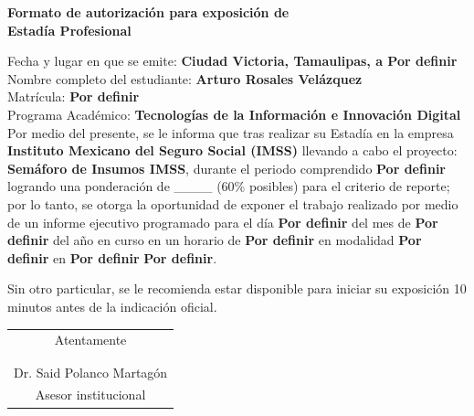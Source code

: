 \documentclass[12pt]{article}
\newcommand{\NombreAlumno}{Arturo Rosales Velázquez}
\newcommand{\NombreProyecto}{Semáforo de Insumos IMSS}
\newcommand{\UnidadEconomica}{Instituto Mexicano del Seguro Social (IMSS)}
\newcommand{\nasesorinstitucional}{Dr. Said Polanco Martagón}
\newcommand{\Matricula}           {Por definir}  %
\newcommand{\ncuatrimestre}{Por definir}
\newcommand{\fechaAutorizacionInforme}               {Por definir}
\newcommand{\DiaEvaluacionPesentacion}{Por definir}
\newcommand{\MesEvaluacionPesentacion}{Por definir}
\newcommand{\HoraEvaluacionPesentacion}{Por definir}
\newcommand{\modalidadEvaluacionPesentacion}{Por definir} %
\newcommand{\tipoAulaOficinaEnlacePesentacion}{Por definir} %
\newcommand{\AulaEvaluacionOEnlaceMeetPesentacion}{Por definir} %
\newcommand{\ncarrera}            {Tecnologías de la Información e Innovación Digital}
\begin{document}
\begin{center}
{\Large \textbf{Formato de autorización para exposición de}}\\[0.125cm]
{\Large \textbf{Estadía Profesional}}\\[0.25cm]
\end{center}

\noindent
Fecha y lugar en que se emite: \textbf{Ciudad Victoria, Tamaulipas, a \fechaAutorizacionInforme } \\[0.125cm]
Nombre completo del estudiante: \textbf{\NombreAlumno} \\[0.125cm]
Matrícula: \textbf{\Matricula}  \\[0.125cm]
Programa Académico: \textbf{\ncarrera}  \\[0.25cm]

\noindent
Por medio del presente, se le informa que tras realizar su Estadía en la empresa \textbf{\UnidadEconomica} llevando a cabo el proyecto: \textbf{\NombreProyecto}, durante el periodo comprendido \textbf{\ncuatrimestre} logrando una ponderación de \_\_\_\_  (60\% posibles) para el criterio de reporte; por lo tanto, se otorga la oportunidad de exponer el trabajo realizado por medio de un informe ejecutivo programado para el día \textbf{\DiaEvaluacionPesentacion} del mes de \textbf{\MesEvaluacionPesentacion} del año en curso en un horario de \textbf{\HoraEvaluacionPesentacion} en modalidad \textbf{\modalidadEvaluacionPesentacion} en \textbf{\tipoAulaOficinaEnlacePesentacion} \textbf{\AulaEvaluacionOEnlaceMeetPesentacion}.

\vspace{0.25cm}

\noindent
Sin otro particular, se le recomienda estar disponible para iniciar su exposición 10 minutos antes de la indicación oficial.

\vspace{0.5cm}

\begin{center}
\begin{tabular}{p{10cm}}
\multicolumn{1}{c}{Atentamente}   \\
 \\
 \\ \hline
\multicolumn{1}{c}{\nasesorinstitucional}   \\
\multicolumn{1}{c}{Asesor institucional}   \\
\end{tabular}
\end{center}

\clearpage
{}
\end{document}
